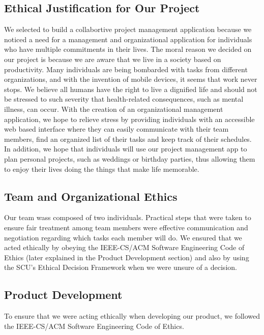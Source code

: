 \subsection{Ethical Justification for Our Project}
 We selected to build a collabortive project management application because we noticed a need for a management and organizational application for individuals who have multiple commitments in their lives. The moral reason we decided on our project is because we are aware that we live in a society based on productivity. Many individuals are being bombarded with tasks from different organizations, and with the invention of mobile devices, it seems that work never stops. We believe all humans have the right to live a dignified life and should not be stressed to such severity that health-related consequences, such as mental illness, can occur. With the creation of an organizational management application, we hope to relieve stress by providing individuals with an accessible web based interface where they can easily communicate with their team members, find an organized list of their tasks and keep track of their schedules. In addition, we hope that individuals will use our project management app to plan personal projects, such as weddings or birthday parties, thus allowing them to enjoy their lives doing the things that make life memorable. 
 \subsection{Team and Organizational Ethics}
 Our team wass composed of two individuals. Practical steps that were taken to ensure fair treatment among team members were effective communication and negotiation regarding which tasks each member will do. We ensured that we acted ethically by obeying the IEEE-CS/ACM Software Engineering Code of Ethics (later explained in the Product Development section) and also by using the SCU’s Ethical Decision Framework when we were unsure of a decision. 
 \subsection{Product Development} 
To ensure that we were acting ethically when developing our product, we followed the  IEEE-CS/ACM Software Engineering Code of Ethics. 

